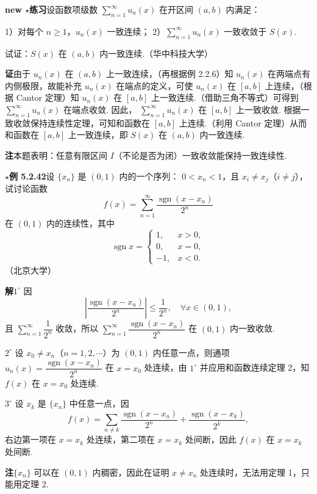 \documentclass[UTF8,12pt,a4paper,fontset=fandol]{ctexart}
\begin{document}
\noindent\textbf{new $\star$练习}\quad 设函数项级数
$\displaystyle\sum_{n=1}^{\infty}u_n(x)$ 在开区间 $(a,b)$ 内满足：

1）对每个 $n\ge1$，$u_n(x)$ 一致连续；
2）$\displaystyle\sum_{n=1}^{\infty}u_n(x)$ 一致收敛于 $S(x)$.

试证：$S(x)$ 在 $(a,b)$ 内一致连续.（华中科技大学）

\noindent\textbf{证}\quad 由于 $u_n(x)$ 在 $(a,b)$ 上一致连续，（再根据例 2.2.6）知
$u_n(x)$ 在两端点有内侧极限，故能补充 $u_n(x)$ 在端点的定义，可使 $u_n(x)$ 在
$[a,b]$ 上连续，（根据 Cantor 定理）知 $u_n(x)$ 在 $[a,b]$ 上一致连续.（借助三角不等式）可得到
$\displaystyle\sum_{n=1}^{\infty}u_n(x)$ 在端点收敛. 因此，
$\displaystyle\sum_{n=1}^{\infty}u_n(x)$ 在 $[a,b]$ 上一致收敛. 根据一致收敛保持连续性定理，可知和函数在
$[a,b]$ 上连续.（利用 Cantor 定理）从而和函数在 $[a,b]$ 上一致连续，即
$S(x)$ 在 $(a,b)$ 内一致连续.

\noindent\textbf{注}\quad 本题表明：任意有限区间 $I$（不论是否为闭）一致收敛能保持一致连续性.

\noindent\textbf{$\star$例 5.2.42}\quad 设 $\{x_n\}$ 是 $(0,1)$ 内的一个序列：
$0<x_n<1$，且 $x_i\ne x_j$（$i\ne j$），试讨论函数
\[
  f(x)=\sum_{n=1}^{\infty}\frac{\operatorname{sgn}(x-x_n)}{2^n}
\]
在 $(0,1)$ 内的连续性，其中
\[
  \operatorname{sgn}x=
  \begin{cases}
    1,& x>0,\\
    0,& x=0,\\
    -1,& x<0.
  \end{cases}
\]
（北京大学）

\noindent\textbf{解}\quad $1^\circ$ 因
\[
  \left|\frac{\operatorname{sgn}(x-x_n)}{2^n}\right|\le\frac1{2^n},
  \quad \forall x\in(0,1),
\]
且 $\displaystyle\sum_{n=1}^{\infty}\dfrac1{2^n}$ 收敛，所以
$\displaystyle\sum_{n=1}^{\infty}\dfrac{\operatorname{sgn}(x-x_n)}{2^n}$ 在
$(0,1)$ 内一致收敛.

$2^\circ$ 设 $x_0\ne x_n$（$n=1,2,\cdots$）为 $(0,1)$ 内任意一点，则通项
$u_n(x)=\dfrac{\operatorname{sgn}(x-x_n)}{2^n}$ 在 $x=x_0$ 处连续，由
$1^\circ$ 并应用和函数连续定理 2，知 $f(x)$ 在 $x=x_0$ 处连续.

$3^\circ$ 设 $x_k$ 是 $\{x_n\}$ 中任意一点，因
\[
  f(x)=\sum_{n\ne k}\frac{\operatorname{sgn}(x-x_n)}{2^n}
  +\frac{\operatorname{sgn}(x-x_k)}{2^k},
\]
右边第一项在 $x=x_k$ 处连续，第二项在 $x=x_k$ 处间断，因此
$f(x)$ 在 $x=x_k$ 处间断.

\noindent\textbf{注}\quad $\{x_n\}$ 可以在 $(0,1)$ 内稠密，因此在证明 $x\ne x_n$ 处连续时，无法用定理 1，只能用定理 2.
\end{document}
